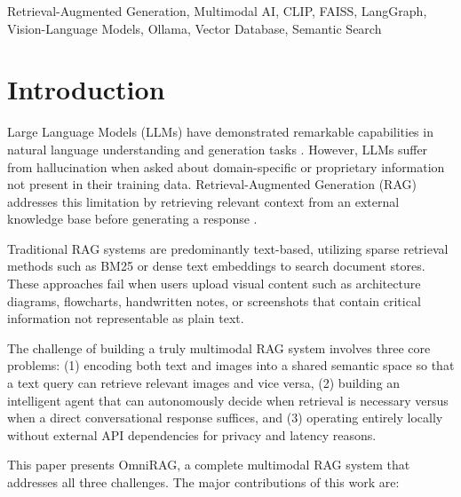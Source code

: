 \documentclass[conference]{IEEEtran}
\begin{document}
\begin{IEEEkeywords}
Retrieval-Augmented Generation, Multimodal AI, CLIP, FAISS, LangGraph, Vision-Language Models, Ollama, Vector Database, Semantic Search
\end{IEEEkeywords}

\section{Introduction}

Large Language Models (LLMs) have demonstrated remarkable capabilities in natural language understanding and generation tasks \cite{devlin2018bert, brown2020gpt3}. However, LLMs suffer from hallucination when asked about domain-specific or proprietary information not present in their training data. Retrieval-Augmented Generation (RAG) addresses this limitation by retrieving relevant context from an external knowledge base before generating a response \cite{lewis2020rag}.

Traditional RAG systems are predominantly text-based, utilizing sparse retrieval methods such as BM25 \cite{robertson2009bm25} or dense text embeddings \cite{karpukhin2020dpr} to search document stores. These approaches fail when users upload visual content such as architecture diagrams, flowcharts, handwritten notes, or screenshots that contain critical information not representable as plain text.

The challenge of building a truly multimodal RAG system involves three core problems: (1) encoding both text and images into a shared semantic space so that a text query can retrieve relevant images and vice versa, (2) building an intelligent agent that can autonomously decide when retrieval is necessary versus when a direct conversational response suffices, and (3) operating entirely locally without external API dependencies for privacy and latency reasons.

This paper presents OmniRAG, a complete multimodal RAG system that addresses all three challenges. The major contributions of this work are:
\end{document}
